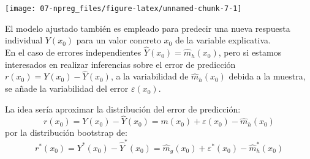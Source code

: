 \documentclass[
]{book}
\theoremstyle{break}
\theoremstyle{definition}
\theoremstyle{definition}
\theoremstyle{definition}
\theoremstyle{definition}
\theoremstyle{remark}
\begin{document}
\begin{center}\texttt{[image: 07-npreg\_files/figure-latex/unnamed-chunk-7-1]} \end{center}

El modelo ajustado también es empleado para predecir una nueva respuesta individual \(Y(x_0)\) para un valor concreto \(x_0\) de la variable explicativa.\\
En el caso de errores independientes \(\hat{Y}(x_0) = \hat{m}_h(x_0)\), pero si estamos interesados en realizar inferencias sobre el error de predicción \(r(x_0) = Y(x_0) - \hat{Y}(x_0)\), a la variabilidad de \(\hat{m}_h(x_0)\) debida a la muestra, se añade la variabilidad del error \(\varepsilon(x_0)\).

La idea sería aproximar la distribución del error de predicción:
\[r(x_0) = Y(x_0) - \hat{Y}(x_0) = m(x_0) + \varepsilon(x_0) - \hat{m}_h(x_0)\]
por la distribución bootstrap de:
\[r^{\ast}(x_0) = Y^{\ast}(x_0) - \hat{Y}^{\ast}(x_0) = \hat{m}_g(x_0) + \varepsilon^{\ast}(x_0) - \hat{m}^{\ast}_h(x_0)\]
\end{document}
